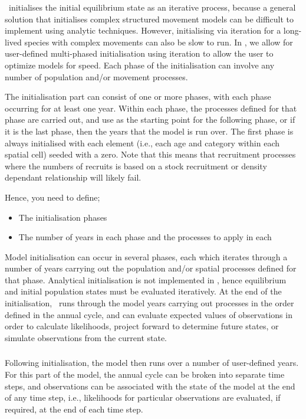 \SPM\ initialises the initial equilibrium state as an iterative process, because a general solution that initialises complex structured movement models can be difficult to implement using analytic techniques. However, initialising via iteration for a long-lived species with complex movements can also be slow to run. In \SPM, we allow for user-defined multi-phased initialisation using iteration to allow the user to optimize models for speed. Each phase of the initialisation can involve any number of population and/or movement processes. 

The initialisation part can consist of one or more phases, with each phase occurring for at least one year. Within each phase, the processes defined for that phase are carried out, and use as the starting point for the following phase, or if it is the last phase, then the years that the model is run over. The first phase is always initialised with each element (i.e., each age and category within each spatial cell) seeded with a zero. Note that this means that recruitment processes where the numbers of recruits is based on a stock recruitment or density dependant relationship will likely fail. 

Hence, you need to define;
\begin{itemize}
  \item The initialisation phases
  \item The number of years in each phase and the processes to apply in each
\end{itemize}

Model initialisation can occur in several phases, each which iterates through a number of years carrying out the population and/or spatial processes defined for that phase. Analytical initialisation is not implemented in \SPM, hence equilibrium and initial population states must be evaluated iteratively. At the end of the initialisation, \SPM\ runs through the model years carrying out processes in the order defined in the annual cycle, and can evaluate expected values of observations in order to calculate likelihoods, project forward to determine future states, or simulate observations from the current state.

\subsubsection{}

Following initialisation, the model then runs over a number of user-defined years. For this part of the model, the annual cycle can be broken into separate time steps, and observations can be associated with the state of the model at the end of any time step, i.e., likelihoods for particular observations are evaluated, if required, at the end of each time step. 


